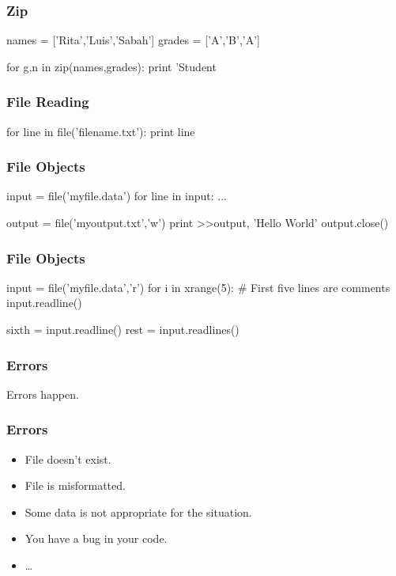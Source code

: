 \begin{frame}[fragile]
\frametitle{Zip}

\begin{python}
names = ['Rita','Luis','Sabah']
grades = ['A','B','A']

for g,n in zip(names,grades):
    print 'Student %
\end{python}

\end{frame}

\begin{frame}[fragile]
\frametitle{File Reading}

\begin{python}
for line in file('filename.txt'):
    print line
\end{python}

\end{frame}

\begin{frame}[fragile]
\frametitle{File Objects}

\begin{python}
input = file('myfile.data')
for line in input:
    ...
\end{python}

\begin{python}
output = file('myoutput.txt','w')
print >>output, 'Hello World\n'
output.close()
\end{python}
\end{frame}

\begin{frame}[fragile]
\frametitle{File Objects}
\begin{python}
input = file('myfile.data','r')
for i in xrange(5):
    # First five lines are comments
    input.readline()

sixth = input.readline()
rest = input.readlines()
\end{python}
\end{frame}


\begin{frame}[fragile]
\frametitle{Errors}
Errors happen.
\end{frame}

\begin{frame}[fragile]
\frametitle{Errors}

\begin{itemize}
\item File doesn't exist.
\item File is misformatted.
\item Some data is not appropriate for the situation.
\item You have a bug in your code.
\item \ldots
\end{itemize}

\end{frame}

